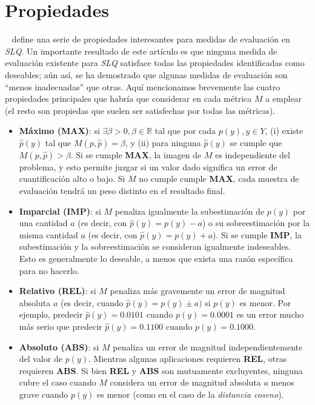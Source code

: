 \section{Propiedades}

~\citet{sebastiani2020evaluation} define una serie de propiedades interesantes
para medidas de evaluación en {\it SLQ}. Un importante resultado de este
artículo es que ninguna medida de evaluación existente para {\it SLQ\/}
satisface todas las propiedades identificadas como deseables; aún así, se ha
demostrado que algunas medidas de evaluación son “menos inadecuadas” que otras.
Aquí mencionamos brevemente las cuatro propiedades principales que habría que
considerar en cada métrica $M$ a emplear (el resto son propiedas que suelen ser
satisfechas por todas las métricas).

\begin{itemize}
    \item {\bf Máximo (MAX)}: si $\exists \beta >0, \beta \in  \mathbb{R}$ tal
    que por cada $p(y), y \in Y$, (i) existe $\hat p(y)$ tal que $M(p, \hat p) =
    \beta$, y (ii) para ninguna $\hat p(y)$ se cumple que $M(p, \hat p) >
    \beta$. Si se cumple {\bf MAX}, la imagen de $M$ es independiente del
    problema, y esto permite juzgar si un valor dado significa un error de
    cuantificación alto o bajo. Si $M$ no cumple cumple {\bf MAX}, cada muestra
    de evaluación tendrá un peso distinto en el resultado final.
    \item {\bf Imparcial (IMP)}: si $M$ penaliza igualmente la subestimación de
    $p(y)$ por una cantidad $a$ (es decir, con $\hat p(y) = p(y) - a$) o su
    sobreestimación por la misma cantidad $a$ (es decir, con $\hat p(y) = p(y) +
    a$). Si se cumple {\bf IMP}, la subestimación y la sobreestimación se
    consideran igualmente indeseables. Esto es generalmente lo deseable, a menos
    que exista una razón específica para no hacerlo.
    \item {\bf Relativo (REL)}: si $M$ penaliza más gravemente un error de
    magnitud absoluta $a$ (es decir, cuando $\hat p(y) = p(y) \pm a)$ si $p(y)$
    es menor. Por ejemplo, predecir $\hat p(y) = 0.0101$ cuando $p(y) = 0.0001$
    es un error mucho más serio que predecir $\hat p(y) = 0.1100$ cuando $p(y) =
    0.1000$.
    \item {\bf Absoluto (ABS)}: si $M$ penaliza un error de magnitud
    independientemente del valor de $p(y)$. Mientras algunas aplicaciones
    requieren {\bf REL}, otras requieren {\bf ABS}. Si bien {\bf REL} y {\bf
    ABS} son mutuamente excluyentes, ninguna cubre el caso cuando $M$ considera
    un error de magnitud absoluta $a$ menos grave cuando $p(y)$ es menor (como
    en el caso de la {\it distancia coseno\/}).
\end{itemize}

